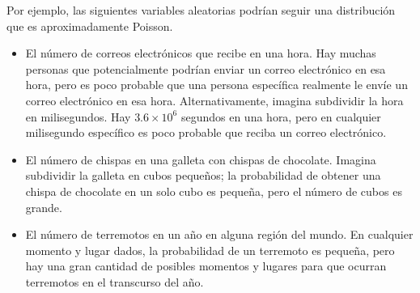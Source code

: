 Por ejemplo, las siguientes variables aleatorias podrían seguir una distribución
que es aproximadamente Poisson.

\begin{itemize}
\item El número de correos electrónicos que recibe en una hora. Hay muchas
personas que potencialmente podrían enviar un correo electrónico en esa hora,
pero es poco probable que una persona específica realmente le envíe un correo
electrónico en esa hora. Alternativamente, imagina subdividir la hora en
milisegundos. Hay $3.6 \times 10^6$ segundos en una hora, pero en cualquier
milisegundo específico es poco probable que reciba un correo electrónico.

\item El número de chispas en una galleta con chispas de chocolate. Imagina
subdividir la galleta en cubos pequeños; la probabilidad de obtener una chispa
de chocolate en un solo cubo es pequeña, pero el número de cubos es grande.

\item El número de terremotos en un año en alguna región del mundo. En cualquier
momento y lugar dados, la probabilidad de un terremoto es pequeña, pero hay una
gran cantidad de posibles momentos y lugares para que ocurran terremotos en el
transcurso del año.

\end{itemize}